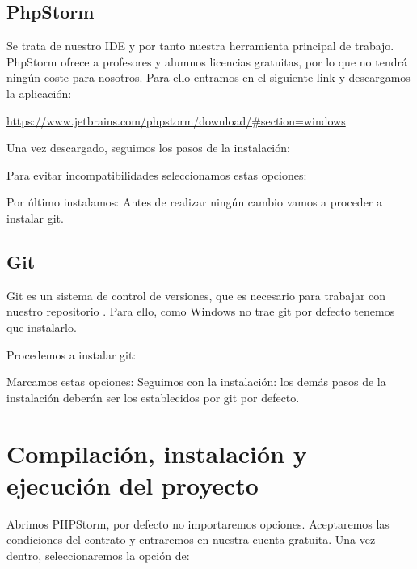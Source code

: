 \subsection{PhpStorm}
Se trata de nuestro IDE y por tanto nuestra herramienta principal de trabajo. PhpStorm \cite{PHPSTORM} ofrece a profesores y alumnos licencias gratuitas, por lo que no tendrá ningún coste para nosotros.
Para ello entramos en el siguiente link y descargamos la aplicación:

\url{https://www.jetbrains.com/phpstorm/download/#section=windows}


Una vez descargado, seguimos los pasos de la instalación:

Para evitar incompatibilidades seleccionamos estas opciones:


Por último instalamos:
Antes de realizar ningún cambio vamos a proceder a instalar git.

\subsection{Git}
Git es un sistema de control de versiones, que es necesario para trabajar con nuestro repositorio \cite{GIT}. Para ello, como Windows no trae git por defecto tenemos que instalarlo.

Procedemos a instalar git:

Marcamos estas opciones:
Seguimos con la instalación: los demás pasos de la instalación deberán ser los establecidos por git por defecto.


\section{Compilación, instalación y ejecución del proyecto}

Abrimos PHPStorm, por defecto no importaremos opciones. Aceptaremos las condiciones del contrato y entraremos en nuestra cuenta gratuita.
Una vez dentro, seleccionaremos la opción de:

